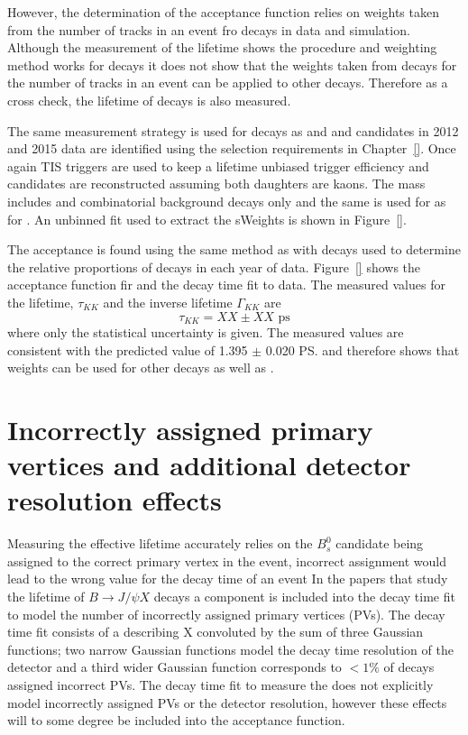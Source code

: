 However, the determination of the \bsmumu acceptance function relies on weights taken from the number of tracks in an event fro \bdkpi decays in data and simulation. Although the measurement of the \bdkpi lifetime shows the procedure and weighting method works for \bdkpi decays it does not show that the weights taken from \bdkpi decays for the number of tracks in an event can be applied to other decays. Therefore as a cross check, the lifetime of \bskk decays is also measured. 

The same measurement strategy is used for \bskk decays as \bsmumu and \bdkpi and candidates in 2012 and 2015 data are identified using the selection requirements in Chapter~\ref{}. Once again TIS triggers are used to keep a lifetime unbiased trigger efficiency and candidates are reconstructed assuming both daughters are kaons. The mass \pdf includes \bskk and combinatorial background decays only and the same \pdf is used for \bskk as for \bskpi. An unbinned \ml fit used to extract the sWeights is shown in Figure~\ref{}. 

The \bskk acceptance is found using the same method as \bsmumu with \bsjpisphi decays used to determine the relative proportions of decays in each year of data. Figure~\ref{} shows the acceptance function fir and the decay time fit to data. The measured values for the lifetime, $\tau_{KK}$ and the inverse lifetime $\Gamma_{KK}$ are
\begin{equation}
\tau_{KK} = XX \pm XX  \text{ ps} 
\end{equation}
where only the statistical uncertainty is given. The measured values are consistent with the predicted value of 1.395 $\pm$ 0.020 \ps \cite{} and therefore shows that \bdkpi weights can be used for other decays as well as \bdkpi. 


\section{Incorrectly assigned primary vertices and additional detector resolution effects}
\label{sec:PVcheck}
Measuring the \bsmumu effective lifetime accurately relies on the $B^{0}_{s}$ candidate being assigned to the correct primary vertex in the event, incorrect assignment would lead to the wrong value for the decay time of an event
In the papers \cite{} that study the lifetime of $B \to J/\psi X$ decays a component is included into the decay time fit to model the number of incorrectly assigned primary vertices (PVs). The decay time fit consists of a \pdf describing X convoluted by the sum of three Gaussian functions; two narrow Gaussian functions model the decay time resolution of the detector and a third wider Gaussian function corresponds to $<1\%$ of decays assigned incorrect PVs. The decay time fit to measure the \bsmumu \el does not explicitly model incorrectly assigned PVs or the detector resolution, however these effects will to some degree be included into the acceptance function. 

